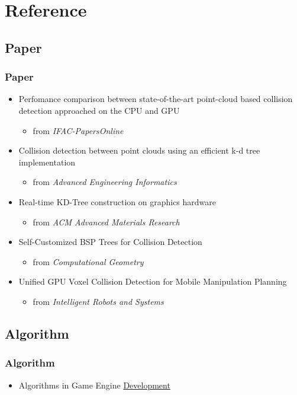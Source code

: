 \documentclass{beamer}
\begin{document}
\section{Reference}

\subsection{Paper}
	\begin{frame}
	\frametitle{Paper}
	\begin{itemize}
		\item Perfomance comparison between state-of-the-art point-cloud based collision detection approached on the CPU and GPU
			\begin{itemize}
				\item from \it{IFAC-PapersOnline}
			\end{itemize}
		\item Collision detection between point clouds using an efficient k-d tree implementation
			\begin{itemize}
				\item from \it{Advanced Engineering Informatics}
			\end{itemize}
		\item Real-time KD-Tree construction on graphics hardware
			\begin{itemize}
				\item from \it{ACM Advanced Materials Research}
			\end{itemize}
		\item Self-Customized BSP Trees for Collision Detection
			\begin{itemize}
				\item from \it{Computational Geometry}
			\end{itemize}
		\item Unified GPU Voxel Collision Detection for Mobile Manipulation Planning
			\begin{itemize}
				\item from \it{Intelligent Robots and Systems}
			\end{itemize}
	\end{itemize}
	\end{frame}

\subsection{Algorithm}
	\begin{frame}
	\frametitle{Algorithm}
	\begin{itemize}
		\item Algorithms in Game Engine \href{http://www.haroldserrano.com/blog/algorithms-in-game-engine-development}{Development}
	\end{itemize}
	\end{frame}
\end{document}
